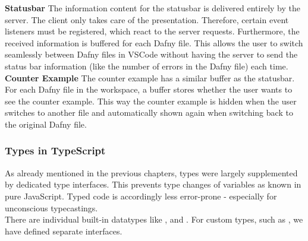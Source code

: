 {\bf Statusbar} \textendash{}
The information content for the statusbar is delivered entirely by the server.
The client only takes care of the presentation.
Therefore, certain event listeners must be registered, which react to the server requests.
Furthermore, the received information is buffered for each Dafny file.
This allows the user to switch seamlessly between Dafny files in VSCode
without having the server to send the status bar information
(like the number of errors in the Dafny file) each time.  \\

{\bf Counter Example} \textendash{}
The counter example has a similar buffer as the statusbar.
For each Dafny file in the workspace, a buffer stores whether the user wants to see the counter example.
This way the counter example is hidden when the user switches to another file
and automatically shown again when switching back to the original Dafny file.

\subsubsection{Types in TypeScript}
As already mentioned in the previous chapters,  types were largely supplemented by dedicated type interfaces. This prevents type changes of variables as known in pure JavaScript. Typed code is accordingly less error-prone - especially for unconscious typecastings. \\

There are individual built-in datatypes like ,  and  \cite{ts-types}.
For custom types, such as , we have defined separate interfaces.




